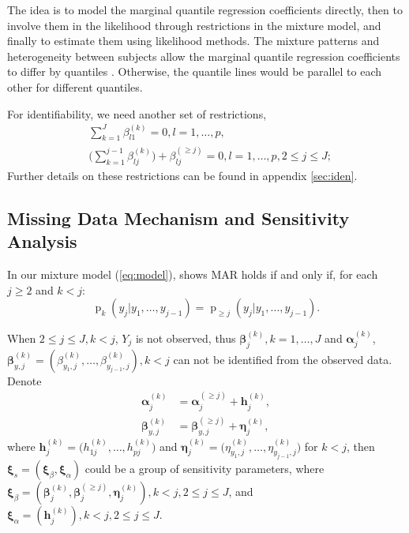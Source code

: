 \documentclass[12pt]{article}
\DeclareMathOperator{\pr}{p}
\begin{document}
The idea is to model the marginal quantile regression coefficients
directly, then to involve them in the likelihood through restrictions
in the mixture model, and finally to estimate
them using likelihood methods. The
mixture patterns and heterogeneity between subjects allow the
 marginal quantile regression coefficients to differ by quantiles 
. Otherwise, the
quantile lines would  be parallel to each other for different
quantiles.

For identifiability, we need another set of restrictions, 
\begin{align*}
  & \sum_{k=1}^J \beta_{l1}^{(k)} = 0, l = 1,\ldots, p, \\
  & \big( \sum_{k=1}^{j-1} \beta_{lj}^{(k)} \big) + \beta_{lj}^{(\geq
    j)} = 0, l = 1, \ldots, p, 2 \leq j \leq J;
\end{align*}
Further details on these restrictions can be found  in appendix
\ref{sec:iden}.

\subsection{Missing Data Mechanism and Sensitivity Analysis}
\label{sec:sa}

In our mixture model (\ref{eq:model}), \citep{molen1998} shows MAR
holds if and only if, for each $j \geq 2$ and $k < j$:
\begin{equation}
  \label{eq:molen}
  \pr_k(y_j|y_1, \ldots, y_{j-1}) = \pr_{\geq j}(y_j|y_1, \ldots, y_{j-1}).
\end{equation}

When $2 \leq j \leq J, k < j$, $Y_j$ is not observed, thus $\bm
\beta_j^{(k)}, k = 1, \ldots, J$ and $\bm \alpha_j^{(k)}$, $ \bm
\beta_{y, j}^{(k)} = (\beta_{y_1,j}^{(k)}, \ldots,
\beta_{y_{j-1},j}^{(k)}), k < j$ can not be identified from the
observed data. Denote
\begin{align*}
  \bm \alpha_j^{(k)} &= \bm \alpha_j^{(\geq j)} + \bm h_j^{(k)}, \\
  \bm \beta_{y, j}^{(k)} &= \bm \beta_{y, j}^{(\geq j)} + \bm
  \eta_j^{(k)},
\end{align*}
where $\bm h_j^{(k)} = \big( h_{1j}^{(k)}, \ldots, h_{pj}^{(k)} \big)$
and $\bm \eta_j^{(k)} = \big( \eta_{y_1,j}^{(k)}, \ldots,
\eta_{y_{j-1}, j}^{(k)} \big)$ for $k < j$, then $\bm \xi_s = ( \bm
\xi_{\beta} , \bm \xi_{\alpha})$ could be a group of sensitivity
parameters, where $\bm \xi_{\beta} = (\bm \beta_j^{(k)}, \bm
\beta_j^{(\geq j)}, \bm \eta_j^{(k)}), k < j, 2 \leq j \leq J $, and
$\bm \xi_{\alpha} = (\bm h_j^{(k)}) , k < j, 2 \leq j \leq J$.
\end{document}
